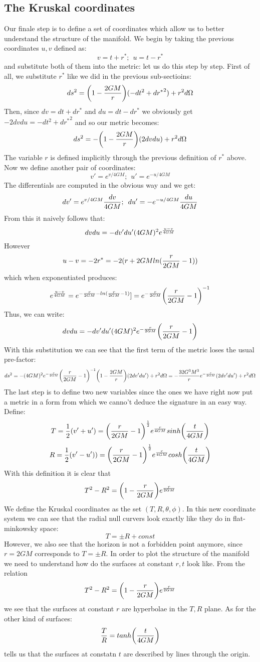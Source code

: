 \documentclass[]{article}
\theoremstyle{definition}
\theoremstyle{Theorem}
\theoremstyle{definition}
\theoremstyle{definition}
\theoremstyle{definition}
\begin{document}
\subsection{The Kruskal coordinates }
Our finale step is to define a set of coordinates which allow us to better understand the structure of the manifold. We begin by taking the previous coordinates $u,v$ defined as:
$$v=t+r^*;\hspace{5pt} u=t-r^*$$ and substitute both of them into the metric: let us do this step by step. First of all, we substitute $r^*$ like we did in the previous sub-sectioins:
$$ds^2=\bigg(1-{2GM\over r}\bigg)(-dt^2+{dr^*}^2)+r^2d\Omega$$
Then, since $dv=dt+dr^*$ and $du=dt-dr^*$ we obviously get $-2dvdu=-dt^2+d{r^*}^2$ and so our metric becomes:
$$ds^2=-\bigg(1-{2GM\over r}\bigg)(2dvdu)+r^2d\Omega$$
The variable $r$ is defined implicitly through the previous definition of $r^*$ above. Now we define another pair of coordinates:
$$v'=e^{v/4GM};\hspace{5pt} u'=e^{-u/4GM}$$
The differentials are computed in the obvious way and we get: $$dv'=e^{v/4GM}{dv\over 4GM};\hspace{5pt} du'=-e^{-u/4GM}{du\over 4GM}$$
From this it naively follows that:
$$dvdu=-dv'du'(4GM)^2e^{u-v\over 4GM}$$
However $$u-v=-2r^*=-2(r+2GMln({r\over 2GM}-1))$$
which when exponentiated produces:
$$e^{u-v\over 4GM}=e^{-{r\over 2GM}-ln({r\over 2GM}-1)}]=e^{-{r\over 2GM}}\bigg({r\over 2GM}-1\bigg)^{-1}$$
Thus, we can write:
$$dvdu=-dv'du'(4GM)^2e^{-{r\over 2GM}}\bigg({r\over 2GM}-1\bigg)$$
With this substitution we can see that the first term of the metric loses the usual pre-factor:
$$ds^2=-(4GM)^2e^{-{r\over 2GM}}\bigg({r\over 2GM}-1\bigg)^{-1}\bigg(1-{2GM\over r}\bigg)(2dv'du')+r^2d\Omega=-{32G^3M^3\over r}e^{-{r\over 2GM}}(2dv'du')+r^2d\Omega$$
The last step is to define two new variables since the ones we have right now put a metric in a form from which we canno't deduce the signature in an easy way.
Define:
$$T={1\over 2}(v'+u')=\bigg({r\over 2GM}-1\bigg)^{1\over 2}e^{r\over 4GM}sinh\bigg({t\over 4GM}\bigg)$$ 
$$R={1\over 2}(v'-u'))=\bigg({r\over 2GM}-1\bigg)^{1\over 2}e^{r\over 4GM}cosh\bigg({t\over 4GM}\bigg)$$
With this definition it is clear that
$$T^2-R^2=\bigg(1-{r\over 2GM}\bigg)e^{r\over 2GM}$$
We define the Kruskal coordinates as the set $(T,R,\theta, \phi)$. In this new coordinate system we can see that the radial null curvers look exactly like they do in flat-minkowsky space:
$$T=\pm R+const$$
However, we also see that the horizon is not a forbidden point anymore, since $r=2GM$ corresponds to $T=\pm R$. In order to plot the structure of the manifold we need to understand how do the surfaces at constant $r,t$ look like. From the relation
$$T^2-R^2=\bigg(1-{r\over 2GM}\bigg)e^{r\over 2GM}$$
we see that the surfaces at constant $r$ are hyperbolae in the $T,R$ plane. As for the other kind of surfaces:
$${T\over R}=tanh\bigg({t\over 4GM}\bigg)$$
tells us that the surfaces at constatn $t$ are described by lines through the origin.
\end{document}
